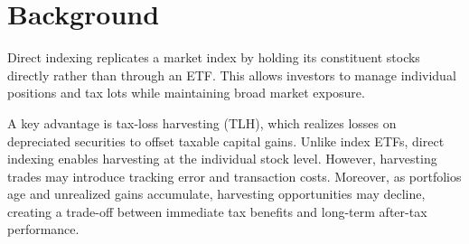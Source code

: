\section{Background}
\label{sec:background}

Direct indexing replicates a market index by holding its constituent stocks directly rather than through an ETF. This allows investors to manage individual positions and tax lots while maintaining broad market exposure.

A key advantage is tax-loss harvesting (TLH), which realizes losses on depreciated securities to offset taxable capital gains. Unlike index ETFs, direct indexing enables harvesting at the individual stock level. However, harvesting trades may introduce tracking error and transaction costs. Moreover, as portfolios age and unrealized gains accumulate, harvesting opportunities may decline, creating a trade-off between immediate tax benefits and long-term after-tax performance.
